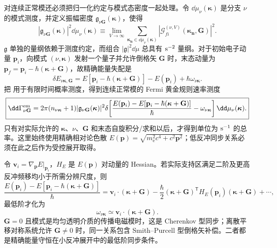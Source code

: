 



对连续正常模还必须把归一化约定与模式态密度一起处理。令 $\dd\mu_\nu(\boldsymbol\kappa)$ 是分支 $\nu$ 的模式测度，并定义振幅密度 $\mathfrak g_{\nu\mathbf G}(\boldsymbol\kappa)$，使得
\[
|\mathfrak g_{\nu\mathbf G}(\boldsymbol\kappa)|^2\dd\mu_\nu(\boldsymbol\kappa)
\equiv
\lim_{V\to\infty}
\sum_{\boldsymbol\kappa_{\mathbf n}\in\dd\mu_\nu(\boldsymbol\kappa)}
|\mathcal G_{fi}^{(\nu,V)}(\boldsymbol\kappa_{\mathbf n},\mathbf G)|^2 .
\]
$\mathfrak g$ 单独的量纲依赖于测度约定，而组合
$|\mathfrak g|^2\dd\mu$ 总具有 ${\rm s^{-2}}$ 量纲。对于初始电子动量 $\mathbf p_i$，向模式 $(\nu,\boldsymbol\kappa)$ 发射一个量子并允许倒格矢 $\mathbf G$ 时，末态动量为
$\mathbf p_f=\mathbf p_i-\hbar(\boldsymbol\kappa+\mathbf G)$，故精确能量失配是
\[
\delta E_{\nu\boldsymbol\kappa,\mathbf G}
=E[\mathbf p_i-\hbar(\boldsymbol\kappa+\mathbf G)]-E(\mathbf p_i)
+\hbar\omega_{\nu\boldsymbol\kappa}.
\]
把 用于有限时间概率测度，得到连续正常模的 Fermi 黄金规则速率测度
\begin{equation}
\boxed{
\dd\Gamma_{\nu\mathbf G}^{\rm em}
=2\pi(n_{\nu\boldsymbol\kappa}+1)
|\mathfrak g_{\nu\mathbf G}(\boldsymbol\kappa)|^2
\delta\!\left[
\frac{E(\mathbf p_i)-E[\mathbf p_i-\hbar(\boldsymbol\kappa+\mathbf G)]}{\hbar}
-\omega_{\nu\boldsymbol\kappa}
\right]\dd\mu_\nu(\boldsymbol\kappa).}
\label{eq:general_free_electron_golden_rule}
\end{equation}
只有对实际允许的 $\boldsymbol\kappa$、$\nu$、$\mathbf G$ 和末态自旋积分/求和以后，才得到单位为 ${\rm s^{-1}}$ 的总率。这里始终使用精确相对论色散
$E(\mathbf p)=\sqrt{m_{\mathrm e}^2c^4+c^2\mathbf p^2}$；低反冲同步关系必须在此之后作为受控展开取得。

令 $\mathbf v_i=\nabla_{\mathbf p}E|_{\mathbf p_i}$，$H_E$ 是 $E(\mathbf p)$ 对动量的 Hessian。若实际支持区满足二阶及更高反冲频移均小于所需分辨尺度，则
\[
\frac{E(\mathbf p_i)-E[\mathbf p_i-\hbar(\boldsymbol\kappa+\mathbf G)]}{\hbar}
=\mathbf v_i\cdot(\boldsymbol\kappa+\mathbf G)
-\frac{\hbar}{2}(\boldsymbol\kappa+\mathbf G)^{\mathsf T}
H_E(\mathbf p_i)(\boldsymbol\kappa+\mathbf G)+\cdots,
\]
最低阶才化为
\begin{equation}
\boxed{
\omega_{\nu\boldsymbol\kappa}\simeq
\mathbf v_i\cdot(\boldsymbol\kappa+\mathbf G).}
\label{eq:generalized_cherenkov_condition}
\end{equation}
$\mathbf G=0$ 且模式是均匀透明介质的传播电磁模时，这是 Cherenkov 型同步；离散平移对称系统允许 $\mathbf G\neq0$ 时，同一关系包含 Smith--Purcell 型倒格矢补偿。二者都是精确能量守恒在小反冲展开中的最低阶同步条件。\cite{RiveraKaminer2020Quasiparticles,GarciaDeAbajo2010RMP}

